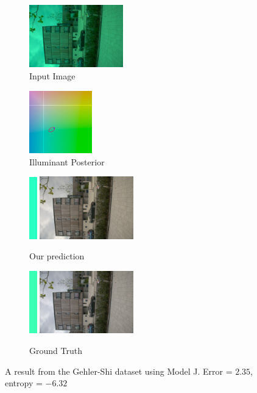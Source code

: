 \documentclass[10pt,twocolumn,letterpaper]{article}
\begin{document}
\begin{figure}[!]
\centering
  \begin{subfigure}[!]{1.7in}
    \includegraphics[width=1.6in]{figures/results/gehlershi/00000107_input.jpg}
    \caption{\footnotesize Input Image}
  \end{subfigure}
  \begin{subfigure}[!]{1.17in}
    \includegraphics[width=1.07in]{figures/results/gehlershi/00000107_chroma.png}
    \caption{\footnotesize Illuminant Posterior}
  \end{subfigure}
\begin{subfigure}[!]{1.9in}
    \includegraphics[width=0.133in]{figures/results/gehlershi/00000107_illum.png}\!
    \includegraphics[width=1.6in]{figures/results/gehlershi/00000107_prediction.jpg}
    \caption{\footnotesize Our prediction}
  \end{subfigure}
  \begin{subfigure}[!]{1.9in}
    \includegraphics[width=0.133in]{figures/results/gehlershi/00000107_illum_true.png}\!
    \includegraphics[width=1.6in]{figures/results/gehlershi/00000107_true.jpg}
    \caption{\footnotesize Ground Truth}
  \end{subfigure}
  \caption{
    A result from the Gehler-Shi dataset using Model J. Error = $2.35$\textdegree, entropy = $-6.32$
    \label{fig:results8}
  }
\end{figure}
\end{document}
